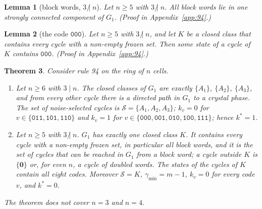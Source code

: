 \documentclass[10pt,a4paper]{article}
\newtheorem{theorem}{Theorem}[section]
\newtheorem{lemma}[theorem]{Lemma}
\newcommand{\zero}{\mathbf{0}}                %
\newcommand{\gmin}{\gamma_{\min}}
\newcommand{\Sel}{\mathcal{S}}                %
\newcommand{\Gone}{G_1}                       %
\newcommand{\kst}{k^{*}}
\newcommand{\code}[1]{\mathtt{#1}}            %
\newcommand{\ndiv}{\mathrel{\not|}}           %
\begin{document}
\begin{lemma}[block words, $3\ndiv n$]\label{94:lem:component}
Let $n\ge5$ with $3\ndiv n$. All block words lie in one strongly connected component of $\Gone$.
(Proof in Appendix~\ref{app:94}.)
\end{lemma}

\begin{lemma}[the code $\code{000}$]\label{94:lem:000}
Let $n\ge5$ with $3\ndiv n$, and let $K$ be a closed class that contains every cycle with a non-empty frozen set.
Then some state of a cycle of $K$ contains $\code{000}$. (Proof in Appendix~\ref{app:94}.)
\end{lemma}

\begin{theorem}\label{94:thm:main}
Consider rule 94 on the ring of $n$ cells.
\begin{enumerate}[label=\textup{(\roman*)},leftmargin=*,nosep]
\item Let $n\ge6$ with $3\mid n$. The closed classes of $\Gone$ are exactly $\{A_1\}$, $\{A_2\}$, $\{A_3\}$, and
from every other cycle there is a directed path in $\Gone$ to a crystal phase. The set of noise-selected cycles is
$\Sel=\{A_1,A_2,A_3\}$; $k_v=0$ for $v\in\{\code{011},\code{101},\code{110}\}$ and $k_v=1$ for
$v\in\{\code{000},\code{001},\code{010},\code{100},\code{111}\}$; hence $\kst=1$.
\item Let $n\ge5$ with $3\ndiv n$. $\Gone$ has exactly one closed class $K$. It contains every cycle with a
non-empty frozen set, in particular all block words, and it is the set of cycles that can be reached in $\Gone$
from a block word; a cycle outside $K$ is $\{\zero\}$ or, for even $n$, a cycle of doubled words. The states of
the cycles of $K$ contain all eight codes. Moreover $\Sel=K$, $\gmin=m-1$, $k_v=0$ for every code $v$, and
$\kst=0$.
\end{enumerate}
The theorem does not cover $n=3$ and $n=4$.
\end{theorem}
\end{document}
